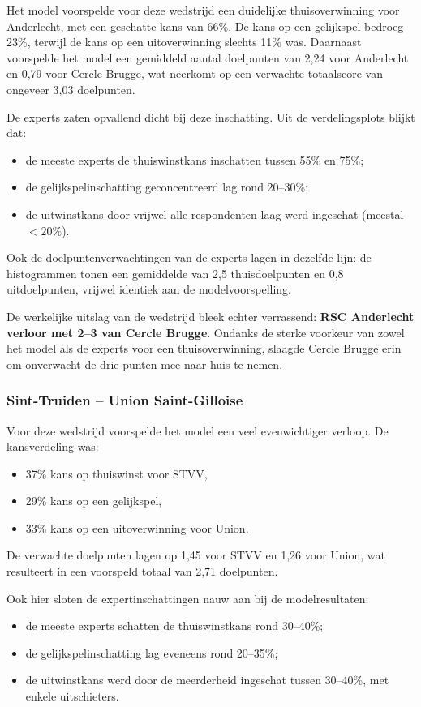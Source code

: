 Het model voorspelde voor deze wedstrijd een duidelijke thuisoverwinning voor Anderlecht, met een geschatte kans van 66\%.
De kans op een gelijkspel bedroeg 23\%, terwijl de kans op een uitoverwinning slechts 11\% was.
Daarnaast voorspelde het model een gemiddeld aantal doelpunten van 2,24 voor Anderlecht en 0,79 voor Cercle Brugge, wat neerkomt op een verwachte totaalscore van ongeveer 3,03 doelpunten.

De experts zaten opvallend dicht bij deze inschatting. Uit de verdelingsplots blijkt dat:
\begin{itemize}
    \item de meeste experts de thuiswinstkans inschatten tussen 55\% en 75\%;
    \item de gelijkspelinschatting geconcentreerd lag rond 20--30\%;
    \item de uitwinstkans door vrijwel alle respondenten laag werd ingeschat (meestal $< 20\%$).
\end{itemize}

Ook de doelpuntenverwachtingen van de experts lagen in dezelfde lijn: de histogrammen tonen een gemiddelde van 2,5 thuisdoelpunten en 0,8 uitdoelpunten, vrijwel identiek aan de modelvoorspelling.

De werkelijke uitslag van de wedstrijd bleek echter verrassend: \textbf{RSC Anderlecht verloor met 2--3 van Cercle Brugge}.
Ondanks de sterke voorkeur van zowel het model als de experts voor een thuisoverwinning, slaagde Cercle Brugge erin om onverwacht de drie punten mee naar huis te nemen.

\subsubsection{Sint-Truiden -- Union Saint-Gilloise}

Voor deze wedstrijd voorspelde het model een veel evenwichtiger verloop. De kansverdeling was:
\begin{itemize}
    \item 37\% kans op thuiswinst voor STVV,
    \item 29\% kans op een gelijkspel,
    \item 33\% kans op een uitoverwinning voor Union.
\end{itemize}

De verwachte doelpunten lagen op 1,45 voor STVV en 1,26 voor Union, wat resulteert in een voorspeld totaal van 2,71 doelpunten.

Ook hier sloten de expertinschattingen nauw aan bij de modelresultaten:
\begin{itemize}
    \item de meeste experts schatten de thuiswinstkans rond 30--40\%;
    \item de gelijkspelinschatting lag eveneens rond 20--35\%;
    \item de uitwinstkans werd door de meerderheid ingeschat tussen 30--40\%, met enkele uitschieters.
\end{itemize}

